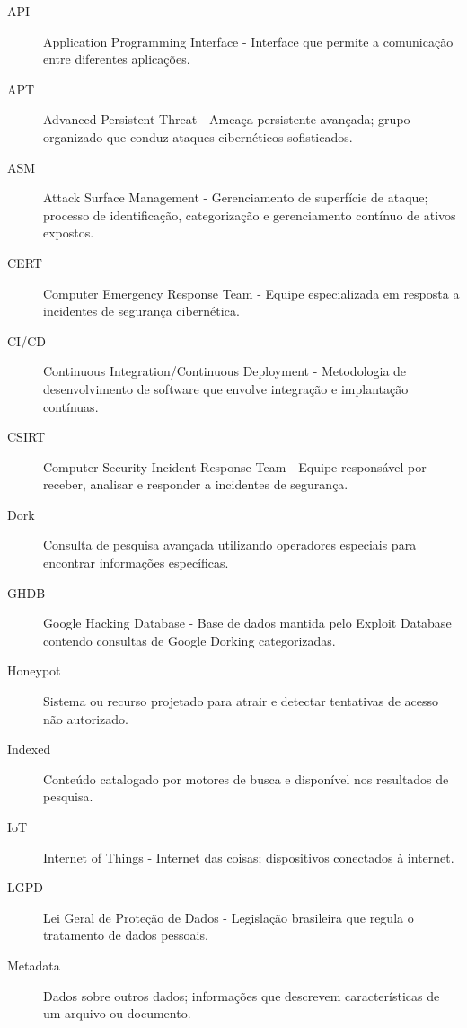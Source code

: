 \documentclass[12pt,a4paper]{book}
\begin{document}
\begin{description}
    \item[API] Application Programming Interface - Interface que permite a comunicação entre diferentes aplicações.
    
    \item[APT] Advanced Persistent Threat - Ameaça persistente avançada; grupo organizado que conduz ataques cibernéticos sofisticados.
    
    \item[ASM] Attack Surface Management - Gerenciamento de superfície de ataque; processo de identificação, categorização e gerenciamento contínuo de ativos expostos.
    
    \item[CERT] Computer Emergency Response Team - Equipe especializada em resposta a incidentes de segurança cibernética.
    
    \item[CI/CD] Continuous Integration/Continuous Deployment - Metodologia de desenvolvimento de software que envolve integração e implantação contínuas.
    
    \item[CSIRT] Computer Security Incident Response Team - Equipe responsável por receber, analisar e responder a incidentes de segurança.
    
    \item[Dork] Consulta de pesquisa avançada utilizando operadores especiais para encontrar informações específicas.
    
    \item[GHDB] Google Hacking Database - Base de dados mantida pelo Exploit Database contendo consultas de Google Dorking categorizadas.
    
    \item[Honeypot] Sistema ou recurso projetado para atrair e detectar tentativas de acesso não autorizado.
    
    \item[Indexed] Conteúdo catalogado por motores de busca e disponível nos resultados de pesquisa.
    
    \item[IoT] Internet of Things - Internet das coisas; dispositivos conectados à internet.
    
    \item[LGPD] Lei Geral de Proteção de Dados - Legislação brasileira que regula o tratamento de dados pessoais.
    
    \item[Metadata] Dados sobre outros dados; informações que descrevem características de um arquivo ou documento.
    

\end{description}
\end{document}
